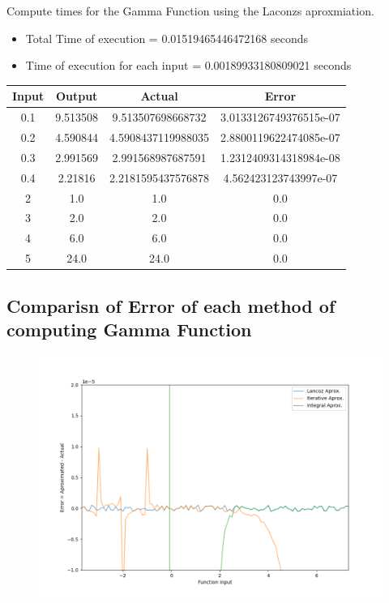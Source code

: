 \documentclass[12pt]{article}
\begin{document}
\begin{bf}
	\flushleft
	Compute times for the Gamma Function using the Laconzs aproxmiation.
\end{bf}

\begin{itemize}
	\item Total Time of execution = 0.01519465446472168 seconds
	\item Time of execution for each input = 0.00189933180809021 seconds
\end{itemize}

\begin{table}[H]
	\centering
	\begin{tabular}{ | c c c c | }
		\hline
		\hline
		Input & Output & Actual & Error\\
		\hline
		\hline
		0.1 & 9.513508 & 9.513507698668732 & 3.0133126749376515e-07\\
		\hline
		0.2 & 4.590844 & 4.5908437119988035 & 2.8800119622474085e-07\\
		\hline
		0.3 & 2.991569 & 2.991568987687591 & 1.2312409314318984e-08\\
		\hline
		0.4 & 2.21816 & 2.2181595437576878 & 4.562423123743997e-07\\
		\hline
		2 & 1.0 & 1.0 & 0.0\\
		\hline
		3 & 2.0 & 2.0 & 0.0\\
		\hline
		4 & 6.0 & 6.0 & 0.0\\
		\hline
		5 & 24.0 & 24.0 & 0.0\\
		\hline
		\hline
	\end{tabular}
\end{table}

\subsection{Comparisn of Error of each method of computing Gamma Function}

\begin{figure}[H]
	\centering
	\includegraphics[width=\textwidth]{test.png}
	\label{fig:test}
\end{figure}
\end{document}

